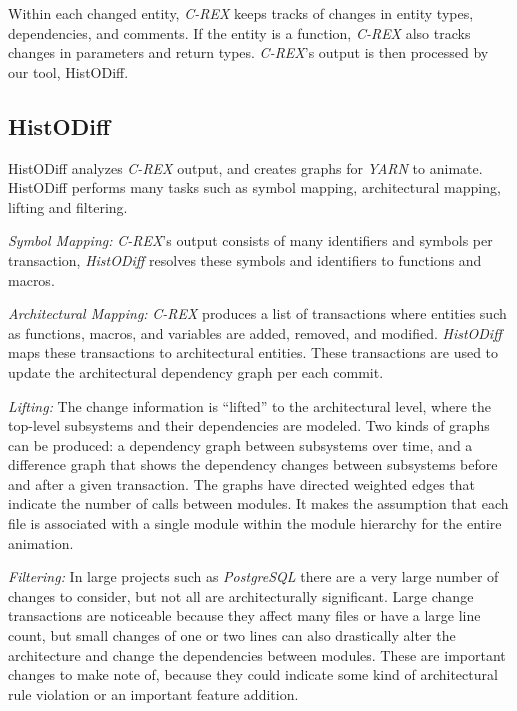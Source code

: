 \documentclass[times, 10pt,twocolumn]{article}
\newcommand{\histodiff}{\emph{HistODiff}\xspace}
\newcommand{\crex}{\emph{C-REX}\xspace}
\newcommand{\yarn}{\emph{YARN\xspace}}
\newcommand{\YARN}{\yarn}
\newcommand{\postgresql}{\emph{PostgreSQL}\xspace}
\newcommand{\Subsection}[1]{\subsection{#1}}
\newcommand{\shtn}{\vspace*{-.5em}}
\begin{document}
Within each changed entity, \crex keeps tracks of changes in entity types,
dependencies, and comments.  If the entity is a function, \crex also
tracks changes in parameters and return types. 
\crex's output is then processed by our
tool, HistODiff.



\shtn
\Subsection{HistODiff}
\shtn


HistODiff analyzes \crex output, and creates graphs for \YARN
to animate. HistODiff performs many tasks such as symbol mapping,
architectural mapping, lifting and filtering.



\emph{Symbol Mapping:} \crex's output consists of many identifiers and
symbols per transaction, \histodiff resolves these symbols and
identifiers to functions and macros.

\emph{Architectural Mapping:} \crex produces a list of transactions
where entities such as functions, macros, and variables are added,
removed, and modified. \histodiff maps these transactions to
architectural entities. These transactions are used to update the
architectural dependency graph per each commit.

\emph{Lifting:} The change information is ``lifted'' to the
architectural level, where the top-level subsystems and their
dependencies are modeled.  Two kinds of graphs can be produced: a
dependency graph between subsystems over time, and a difference graph
that shows the dependency changes between subsystems before and after
a given transaction.  The graphs have directed weighted edges that
indicate the number of calls between modules.  It makes the assumption
that each file is associated with a single module within the module
hierarchy for the entire animation.

\emph{Filtering:} In large projects such as \postgresql there are a
very large number of changes to consider, but not all are
architecturally significant.  Large change transactions are noticeable
because they affect many files or have a large line count, but small
changes of one or two lines can also drastically alter the
architecture and change the dependencies between modules.  These are
important changes to make note of, because they could indicate some
kind of architectural rule violation or an important feature addition.
\end{document}
